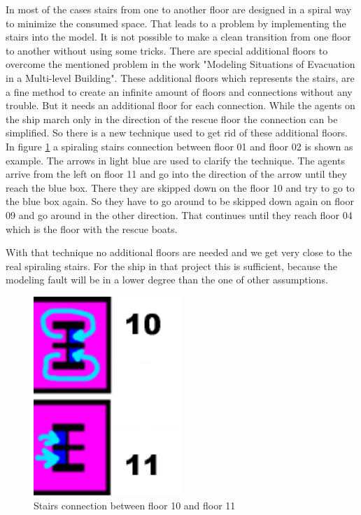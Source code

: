 \documentclass[11pt]{article}
\begin{document}
In most of the cases stairs from one to another floor are designed in a spiral way to minimize the consumed space. That leads to a problem by implementing the stairs into the model. It is not possible to make a clean transition from one floor to another without using some tricks.
\newline
There are special additional floors to overcome the mentioned problem in the work "Modeling Situations of Evacuation in a Multi-level Building"\cite{Building}. These additional floors which represents the stairs, are a fine method to create an infinite amount of floors and connections without any trouble. But it needs an additional floor for each connection.
\newline
While the agents on the ship march only in the direction of the rescue floor the connection can be simplified. So there is a new technique used to get rid of these additional floors.
\newline
In figure \ref{Decktwostairs} a spiraling stairs connection between floor 01 and floor 02 is shown as example. The arrows in light blue are used to clarify the technique.
\newline
The agents arrive from the left on floor 11 and go into the direction of the arrow until they reach the blue box. There they are skipped down on  the floor 10 and try to go to the blue box again. So they have to go around to be skipped down again on floor 09 and go around in the other direction. That continues until they reach floor 04 which is the floor with the rescue boats.

With that technique no additional floors are needed and we get very close to the real spiraling stairs. For the ship in that project this is sufficient, because the modeling fault will be in a lower degree than the one of other assumptions.

\begin{figure}[H]
\centering
{\begin{minipage}[t]{7.4cm}
\includegraphics [width=0.5\textwidth]{pics/Decktwostairs.pdf}
\caption{Stairs connection between floor 10 and floor 11}
\label{Decktwostairs}
\end{minipage}}
\end{figure}
\end{document}
